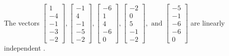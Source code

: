 \begin{exercise}
\begin{exerciseStatement}
  \end{exerciseStatement}
  \begin{exerciseAnswer}
   The vectors \(\left[\begin{array}{r}
1 \\
-4 \\
-1 \\
-3 \\
-2
\end{array}\right] , \left[\begin{array}{r}
-1 \\
4 \\
-1 \\
-5 \\
-2
\end{array}\right] , \left[\begin{array}{r}
-6 \\
1 \\
4 \\
-6 \\
0
\end{array}\right] , \left[\begin{array}{r}
-2 \\
0 \\
5 \\
-1 \\
-2
\end{array}\right] , \text{ and } \left[\begin{array}{r}
-5 \\
-1 \\
-6 \\
-6 \\
0
\end{array}\right]\) are 
  	 linearly independent  .
  


  \end{exerciseAnswer}
\end{exercise}